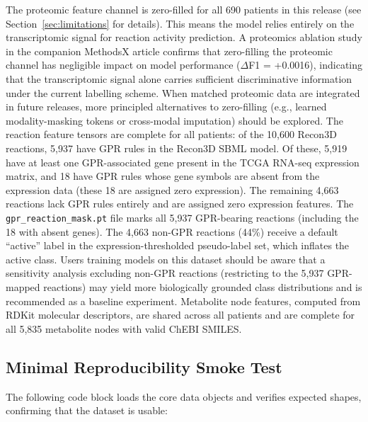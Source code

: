 \documentclass[12pt,a4paper]{article}
\begin{document}
The proteomic feature channel is zero-filled for all 690 patients in this release (see Section~\ref{sec:limitations} for details). This means the model relies entirely on the transcriptomic signal for reaction activity prediction. A proteomics ablation study in the companion MethodsX article \cite{Phongwattana2026} confirms that zero-filling the proteomic channel has negligible impact on model performance ($\Delta$F1 = +0.0016), indicating that the transcriptomic signal alone carries sufficient discriminative information under the current labelling scheme. When matched proteomic data are integrated in future releases, more principled alternatives to zero-filling (e.g., learned modality-masking tokens or cross-modal imputation) should be explored. The reaction feature tensors are complete for all patients: of the 10,600 Recon3D reactions, 5,937 have GPR rules in the Recon3D SBML model. Of these, 5,919 have at least one GPR-associated gene present in the TCGA RNA-seq expression matrix, and 18 have GPR rules whose gene symbols are absent from the expression data (these 18 are assigned zero expression). The remaining 4,663 reactions lack GPR rules entirely and are assigned zero expression features. The \texttt{gpr\_reaction\_mask.pt} file marks all 5,937 GPR-bearing reactions (including the 18 with absent genes). The 4,663 non-GPR reactions (44\%) receive a default ``active'' label in the expression-thresholded pseudo-label set, which inflates the active class. Users training models on this dataset should be aware that a sensitivity analysis excluding non-GPR reactions (restricting to the 5,937 GPR-mapped reactions) may yield more biologically grounded class distributions and is recommended as a baseline experiment. Metabolite node features, computed from RDKit molecular descriptors, are shared across all patients and are complete for all 5,835 metabolite nodes with valid ChEBI SMILES.

\subsection{Minimal Reproducibility Smoke Test}

The following code block loads the core data objects and verifies expected shapes, confirming that the dataset is usable:
\end{document}

